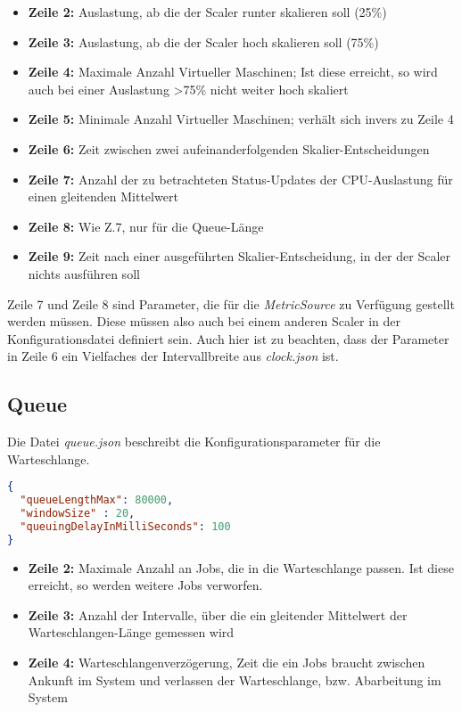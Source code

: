 \begin{itemize}
	\item \textbf{Zeile 2:} Auslastung, ab die der Scaler runter skalieren soll (25\%)
	\item \textbf{Zeile 3:} Auslastung, ab die der Scaler hoch skalieren soll (75\%)
	\item \textbf{Zeile 4:} Maximale Anzahl Virtueller Maschinen; Ist diese erreicht, so wird auch bei einer Auslastung >75\% nicht weiter hoch skaliert
	\item \textbf{Zeile 5:} Minimale Anzahl Virtueller Maschinen; verhält sich invers zu Zeile 4
	\item \textbf{Zeile 6:} Zeit zwischen zwei aufeinanderfolgenden Skalier-Entscheidungen
	\item \textbf{Zeile 7:} Anzahl der zu betrachteten Status-Updates der CPU-Auslastung für einen gleitenden Mittelwert
	\item \textbf{Zeile 8:} Wie Z.7, nur für die Queue-Länge 
	\item \textbf{Zeile 9:} Zeit nach einer ausgeführten Skalier-Entscheidung, in der der Scaler nichts ausführen soll 
	
\end{itemize}

\noindent
Zeile 7 und Zeile 8 sind Parameter, die für die \textit{MetricSource} zu Verfügung gestellt werden müssen. Diese müssen also auch bei einem anderen Scaler in der Konfigurationsdatei definiert sein. Auch hier ist zu beachten, dass der Parameter in Zeile 6 ein Vielfaches der Intervallbreite aus \textit{clock.json} ist.

\subsection{Queue}
Die Datei \textit{queue.json} beschreibt die Konfigurationsparameter für die Warteschlange.



\begin{lstlisting}[language=json,firstnumber=1, caption={queue.json}]
{
  "queueLengthMax": 80000,
  "windowSize" : 20,
  "queuingDelayInMilliSeconds": 100
} 
\end{lstlisting}

\begin{itemize}
	\item \textbf{Zeile 2:} Maximale Anzahl an Jobs, die in die Warteschlange passen. Ist diese erreicht, so werden weitere Jobs verworfen.
	\item \textbf{Zeile 3:} Anzahl der Intervalle, über die ein gleitender Mittelwert der Warteschlangen-Länge gemessen wird  
	\item \textbf{Zeile 4:} Warteschlangenverzögerung, Zeit die ein Jobs braucht zwischen Ankunft im System und verlassen der Warteschlange, bzw. Abarbeitung im System
	
\end{itemize}

